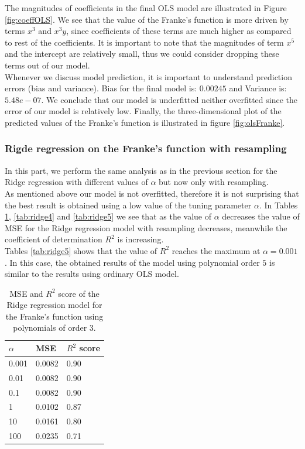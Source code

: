 \documentclass [11pt]{article}
\begin{document}
The magnitudes of coefficients in the final OLS model are illustrated in Figure \ref{fig:coeffOLS}. We see that the value of the Franke's function is more driven by terms $x^{3}$ and $x^{3}y$, since coefficients of these terms are much higher as compared to rest of the coefficients. It is important to note that the magnitudes of term $x^{5}$ and the intercept are relatively small, thus we could consider dropping these terms out of our model.\\
Whenever we discuss model prediction, it is important to understand prediction errors (bias and variance). Bias for the final model is: $0.00245$ and Variance is: $5.48e-07$. We conclude that our model is underfitted neither overfitted since the error of our model is relatively low. Finally, the three-dimensional plot of the predicted values of the Franke’s function is illustrated in figure \ref{fig:olsFranke}.


\subsubsection{Rigde regression on the Franke's function  with resampling}
In this part, we perform the same analysis as in the previous section for the Ridge regression with different values of $\alpha$ but now only with resampling.\\
As mentioned above our model is not overfitted, therefore it is not surprising that the best result is obtained using a low value of the tuning parameter $\alpha$. In Tables \ref{tab:ridge3}, \ref{tab:ridge4} and \ref{tab:ridge5} we see that as the value of $\alpha$ decreases the value of MSE for the Ridge regression model with resampling decreases, meanwhile the coefficient of determination $R^{2}$ is increasing.\\
Tables \ref{tab:ridge5} shows that the value of $R^{2}$ reaches the maximum at $\alpha=0.001$. In this case, the obtained results of the model using polynomial order $5$ is similar to the results using ordinary OLS model.
\begin{table}[H]
\centering
\begin{tabular}{lll}
\hline
$\alpha$ & MSE    & $R^{2}$ score \\ \hline
0.001     & 0.0082 & 0.90          \\
0.01      & 0.0082 & 0.90          \\
0.1       & 0.0082 & 0.90          \\
1         & 0.0102 & 0.87          \\
10        & 0.0161 & 0.80          \\
100       & 0.0235 & 0.71          \\ \hline
\end{tabular}
\caption{MSE and $R^{2}$ score of the Ridge regression model for the Franke's function using polynomials of order $3$.}
\label{tab:ridge3}
\end{table}
\end{document}
